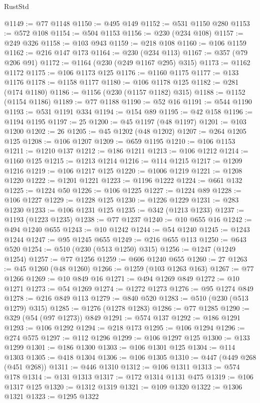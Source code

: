 \begin{lexlean}{RustStd}
\begin{coremodule}
@1149 := @77 @1148
@1150 := @495 @149
@1152 := @531 @1150 @280
@1153 := @572 @108
@1154 := @504 @1153
@1156 := @230 (@234 @108)
@1157 := @249 @326
@1158 := @103 @943
@1159 := @218 @108
@1160 := @106 @1159
@1162 := @216 @147 @173
@1164 := @230 (@234 @113)
@1167 := @357 (@79 @206 @91)
@1172 := @1164 (@230 (@249 @1167 @295) @315)
@1173 := @1162 @1172
@1175 := @106 @1173 @125
@1176 := @1160 @1175
@1177 := @133 @1176
@1178 := @1158 @1177
@1180 := @106 @1178 @125
@1182 := @281 (@174 @1180)
@1186 := @1156 (@230 (@1157 @1182) @315)
@1188 := @1152 (@1154 @1186)
@1189 := @77 @1188
@1190 := @52 @16
@1191 := @544 @1190
@1193 := @531 @1191 @334
@1194 := @154 @89
@1195 := @42 @158
@1196 := @1194 @1195
@1197 := 25
@1200 := @45 @1197 (@48 @1197)
@1201 := @103 @1200
@1202 := 26
@1205 := @45 @1202 (@48 @1202)
@1207 := @264 @1205 @125
@1208 := @106 @1207
@1209 := @659 @1195
@1210 := @106 @1153
@1211 := @1210 @137
@1212 := @186 @1211
@1213 := @106 @1212
@1214 := @1160 @125
@1215 := @1213 @1214
@1216 := @114 @1215
@1217 := @1209 @1216
@1219 := @106 @1217 @125
@1220 := @1006 @1219
@1221 := @1208 @1220
@1222 := @1201 @1221
@1223 := @1196 @1222
@1224 := @661 @132
@1225 := @1224 @50
@1226 := @106 @1225
@1227 := @1224 @89
@1228 := @106 @1227
@1229 := @1228 @125
@1230 := @1226 @1229
@1231 := @283 @1230
@1233 := @106 @1231 @125
@1235 := @342 (@1213 @1233)
@1237 := @1193 (@1223 @1235)
@1238 := @77 @1237
@1240 := @10 @655 @16
@1242 := @494 @1240 @655
@1243 := @10 @1242
@1244 := @54 @1240
@1245 := @1243 @1244
@1247 := @95 @1245 @655
@1249 := @216 @655 @113
@1250 := @643 @520
@1254 := @510 (@230 (@513 @1250) @315)
@1256 := @1247 (@1249 @1254)
@1257 := @77 @1256
@1259 := @606 @1240 @655
@1260 := 27
@1263 := @45 @1260 (@48 @1260)
@1266 := @1259 (@103 @1263 @163)
@1267 := @77 @1266
@1269 := @10 @849 @16
@1271 := @494 @1269 @849
@1272 := @10 @1271
@1273 := @54 @1269
@1274 := @1272 @1273
@1276 := @95 @1274 @849
@1278 := @216 @849 @113
@1279 := @840 @520
@1283 := @510 (@230 (@513 @1279) @315)
@1285 := @1276 (@1278 @1283)
@1286 := @77 @1285
@1290 := @329 (@54 (@97 @1273)) @849
@1291 := @574 @137
@1292 := @186 @1291
@1293 := @106 @1292
@1294 := @218 @173
@1295 := @106 @1294
@1296 := @274 @575
@1297 := @112 @1296
@1299 := @106 @1297 @125
@1300 := @133 @1299
@1301 := @186 @1300
@1303 := @106 @1301 @125
@1304 := @114 @1303
@1305 := @418 @1304
@1306 := @106 @1305
@1310 := @447 (@449 @268 (@451 @268))
@1311 := @446 @1310
@1312 := @106 @1311
@1313 := @574 @178
@1314 := @131 @1313
@1317 := @172 @1314 @1131 @475
@1319 := @106 @1317 @125
@1320 := @1312 @1319
@1321 := @109 @1320
@1322 := @1306 @1321
@1323 := @1295 @1322

\end{coremodule}
\end{lexlean}
